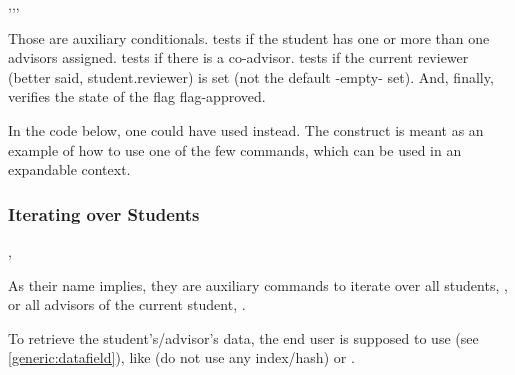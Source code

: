 \documentclass[10pt]{article}
\begin{document}
\begin{codedescribe}{\studentcase,\studentadvcase,\studentcoadvcase,\studentreviewersetcase}
\begin{codesyntax}
\end{codesyntax}
 Those are auxiliary conditionals. \tsobj{\studentAdvCase} tests if the student has one or more than one advisors assigned. \tsobj{\studentCoadvCase} tests if there is a co-advisor. \tsobj{\studentReviewerSetCase} tests if the current reviewer (better said, student.reviewer) is set (not the default -empty- set). And, finally, \tsobj{\studentCase} verifies the state of the flag flag-approved.
\end{codedescribe}
\begin{tsremark}
  In the code below, one could have used  instead. The construct is meant as an example of how to use one of the few  commands, which can be used in an expandable context.
\end{tsremark}



\subsubsection{Iterating over Students}

\begin{codedescribe}{\studentiterate,\studentadvisoriterate}
  \begin{codesyntax}
  \end{codesyntax}
  As their name implies, they are auxiliary commands to iterate over all students, \tsobj{\studentiterate}, or all advisors of the current student, \tsobj{\studentadvisoriterate}.
\end{codedescribe}
\begin{tsremark}
  To retrieve the student's/advisor's data, the end user is supposed to use \tsobj[code,sep=or]{\DataField,\DataGet} (see \ref{generic:datafield}), like  (do not use any index/hash) or .
\end{tsremark}
\end{document}
